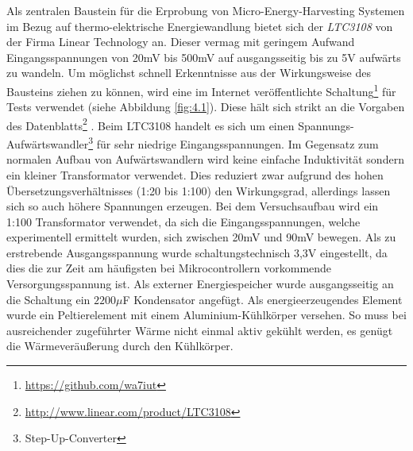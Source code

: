 \documentclass[12pt]{scrreprt} %
\begin{document}
Als zentralen Baustein für die Erprobung von Micro-Energy-Harvesting Systemen im Bezug auf thermo-elektrische Energiewandlung bietet sich der \textit{LTC3108} von der Firma Linear Technology an. Dieser vermag mit geringem Aufwand Eingangsspannungen von 20mV bis 500mV auf ausgangsseitig bis zu 5V aufwärts zu wandeln. Um möglichst schnell Erkenntnisse aus der Wirkungsweise des Bausteins ziehen zu können, wird eine im Internet veröffentlichte Schaltung\footnote{\url{https://github.com/wa7iut}} für Tests verwendet (siehe Abbildung \vref{fig:4.1}). Diese hält sich strikt an die Vorgaben des Datenblatts\footnote{\url{http://www.linear.com/product/LTC3108}} \citep{LTC3108}. Beim LTC3108 handelt es sich um einen Spannungs-Aufwärtswandler\footnote{Step-Up-Converter} für sehr niedrige Eingangsspannungen. Im Gegensatz zum normalen Aufbau von Aufwärtswandlern wird keine einfache Induktivität sondern ein kleiner Transformator verwendet. Dies reduziert zwar aufgrund des hohen Übersetzungsverhältnisses (1:20 bis 1:100) den Wirkungsgrad, allerdings lassen sich so auch höhere Spannungen erzeugen. Bei dem Versuchsaufbau wird ein 1:100 Transformator verwendet, da sich die Eingangsspannungen, welche experimentell ermittelt wurden, sich zwischen 20mV und 90mV bewegen. Als zu erstrebende Ausgangsspannung wurde schaltungstechnisch 3,3V eingestellt, da dies die zur Zeit am häufigsten bei Mikrocontrollern vorkommende Versorgungsspannung ist. Als externer Energiespeicher wurde ausgangsseitig an die Schaltung ein $2200 \mu$F Kondensator angefügt. Als energieerzeugendes Element wurde ein Peltierelement mit einem Aluminium-Kühlkörper versehen. So muss bei ausreichender zugeführter Wärme nicht einmal aktiv gekühlt werden, es genügt die Wärmeveräußerung durch den Kühlkörper.%
\end{document}
